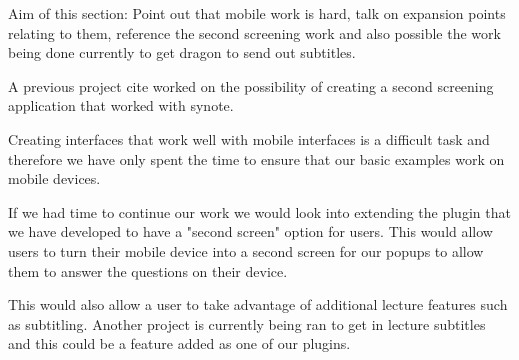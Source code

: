 Aim of this section: Point out that mobile work is hard, talk on expansion points relating to them, reference the second screening work and also possible the work being done currently to get dragon to send out subtitles.

A previous project {cite} worked on the possibility of creating a second screening application that worked with synote.

Creating interfaces that work well with mobile interfaces is a difficult task and therefore we have only spent the time to ensure that our basic examples work on mobile devices.

If we had time to continue our work we would look into extending the plugin that we have developed to have a "second screen" option for users. This would allow users to turn their mobile device into a second screen for our popups to allow them to answer the questions on their device.

This would also allow a user to take advantage of additional lecture features such as subtitling. Another project is currently being ran to get in lecture subtitles and this could be a feature added as one of our plugins.